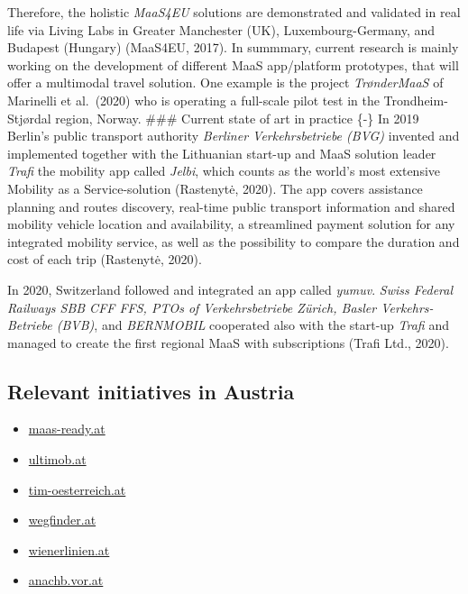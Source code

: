 \documentclass[
]{book}
\providecommand{\tightlist}{%
  \setlength{\itemsep}{0pt}\setlength{\parskip}{0pt}}
\begin{document}
Therefore, the holistic \emph{MaaS4EU} solutions are demonstrated and validated in real life via Living Labs in Greater Manchester (UK), Luxembourg-Germany, and Budapest (Hungary) (MaaS4EU, 2017). In summmary, current research is mainly working on the development of different MaaS app/platform prototypes, that will offer a multimodal travel solution. One example is the project \emph{TrønderMaaS} of Marinelli et al.~(2020) who is operating a full-scale pilot test in the Trondheim-Stjørdal region, Norway.
\#\#\# Current state of art in practice \{-\}
In 2019 Berlin's public transport authority \emph{Berliner Verkehrsbetriebe (BVG)} invented and implemented together with the Lithuanian start-up and MaaS solution leader \emph{Trafi} the mobility app called \emph{Jelbi}, which counts as the world's most extensive Mobility as a Service-solution (Rastenytė, 2020). The app covers assistance planning and routes discovery, real-time public transport information and shared mobility vehicle location and availability, a streamlined payment solution for any integrated mobility service, as well as the possibility to compare the duration and cost of each trip (Rastenytė, 2020).

In 2020, Switzerland followed and integrated an app called \emph{yumuv}. \emph{Swiss Federal Railways SBB CFF FFS, PTOs of Verkehrsbetriebe Zürich, Basler Verkehrs-Betriebe (BVB)}, and \emph{BERNMOBIL} cooperated also with the start-up \emph{Trafi} and managed to create the first regional MaaS with subscriptions (Trafi Ltd., 2020).

\hypertarget{relevant-initiatives-in-austria-6}{%
\subsection*{Relevant initiatives in Austria}\label{relevant-initiatives-in-austria-6}}

\begin{itemize}
\tightlist
\item
  \href{https://maas-ready.at}{maas-ready.at}
\item
  \href{https://www.ultimob.at}{ultimob.at}
\item
  \href{https://www.tim-oesterreich.at/graz/}{tim-oesterreich.at}
\item
  \href{https://wegfinder.at/}{wegfinder.at}
\item
  \href{https://www.wienerlinien.at/eportal3/ep/channelView.do/pageTypeId/66526/channelId/-3600060}{wienerlinien.at}
\item
  \href{https://anachb.vor.at/}{anachb.vor.at}
\end{itemize}
\end{document}
